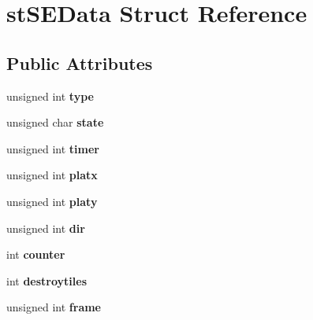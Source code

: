 \hypertarget{structst_s_e_data}{
\section{stSEData Struct Reference}
\label{structst_s_e_data}
}
\subsection*{Public Attributes}
\begin{DoxyCompactItemize}
\item 
\hypertarget{structst_s_e_data_a905fafd3ab6fa5258854c0fd2931321b}{
unsigned int {\bfseries type}}
\label{structst_s_e_data_a905fafd3ab6fa5258854c0fd2931321b}

\item 
\hypertarget{structst_s_e_data_a04e5629cafe351a5e9ec6d3bc443386f}{
unsigned char {\bfseries state}}
\label{structst_s_e_data_a04e5629cafe351a5e9ec6d3bc443386f}

\item 
\hypertarget{structst_s_e_data_a4578930ca88cf83227865ce82859f7c4}{
unsigned int {\bfseries timer}}
\label{structst_s_e_data_a4578930ca88cf83227865ce82859f7c4}

\item 
\hypertarget{structst_s_e_data_a60be7ec2acfff33f68fe017cd5d7af24}{
unsigned int {\bfseries platx}}
\label{structst_s_e_data_a60be7ec2acfff33f68fe017cd5d7af24}

\item 
\hypertarget{structst_s_e_data_aeab0a9b21ff2fa025561232cecf4877b}{
unsigned int {\bfseries platy}}
\label{structst_s_e_data_aeab0a9b21ff2fa025561232cecf4877b}

\item 
\hypertarget{structst_s_e_data_a3b8df23b154d45ea75abb40ce0cb0bec}{
unsigned int {\bfseries dir}}
\label{structst_s_e_data_a3b8df23b154d45ea75abb40ce0cb0bec}

\item 
\hypertarget{structst_s_e_data_af453358abbbfea9799e7a76f3079c010}{
int {\bfseries counter}}
\label{structst_s_e_data_af453358abbbfea9799e7a76f3079c010}

\item 
\hypertarget{structst_s_e_data_a04060671a2b658cac34dfda639f16904}{
int {\bfseries destroytiles}}
\label{structst_s_e_data_a04060671a2b658cac34dfda639f16904}

\item 
\hypertarget{structst_s_e_data_a19085be52f0dd648fa71916d1cfad211}{
unsigned int {\bfseries frame}}
\label{structst_s_e_data_a19085be52f0dd648fa71916d1cfad211}


\end{DoxyCompactItemize}
